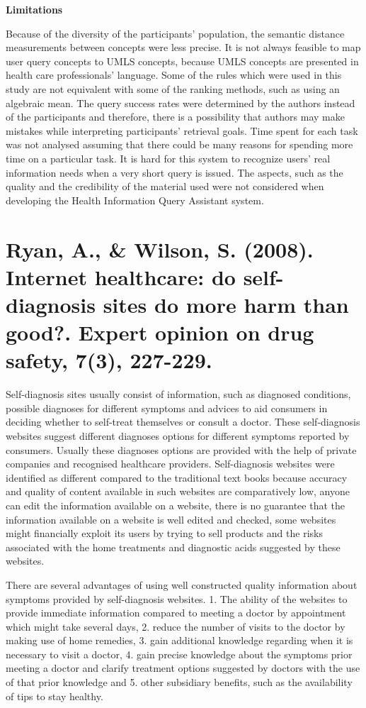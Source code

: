 \documentclass[]{article}
\begin{document}
\textbf{Limitations}

Because of the diversity of the participants' population, the semantic distance measurements between concepts were less precise. It is not always feasible to map user query concepts to UMLS concepts, because UMLS concepts are presented in health care professionals’ language. Some of the rules which were used in this study are not equivalent with some of the ranking methods, such as using an algebraic mean. The query success rates were determined by the authors instead of the participants and therefore, there is a possibility that authors may make mistakes while interpreting participants' retrieval goals. Time spent for each task was not analysed assuming that there could be many reasons for spending more time on a particular task. It is hard for this system to recognize users' real information needs when a very short query is issued. The aspects, such as the quality and the credibility of the material used were not considered when developing the Health Information Query Assistant system.

\section{Ryan, A., \& Wilson, S. (2008). Internet healthcare: do self-diagnosis sites do more harm than good?. Expert opinion on drug safety, 7(3), 227-229.}

Self-diagnosis sites usually consist of information, such as diagnosed conditions, possible diagnoses for different symptoms and advices to aid consumers in deciding whether to self-treat themselves or consult a doctor. These self-diagnosis websites suggest different diagnoses options for different symptoms reported by consumers. Usually these diagnoses options are provided with the help of private companies and recognised healthcare providers. Self-diagnosis websites were identified as different compared to the traditional text books because  accuracy and quality of content available in such websites are comparatively low, anyone can edit the information available on a website, there is no guarantee that the information available on a website is well edited and checked, some websites might financially exploit its users by trying to sell products and the risks associated with the home treatments and diagnostic acids suggested by these websites. 

There are several advantages of using well constructed quality information about symptoms provided by self-diagnosis websites. 1. The ability of the websites to provide immediate information compared to meeting a doctor by appointment which might take several days, 2. reduce the number of visits to the doctor by making use of home remedies, 3. gain additional knowledge regarding when it is necessary to visit a doctor, 4. gain precise knowledge about the symptoms prior meeting a doctor and clarify treatment options suggested by doctors with the use of that prior knowledge and 5. other subsidiary benefits, such as the availability of tips to stay healthy. 
\end{document}
